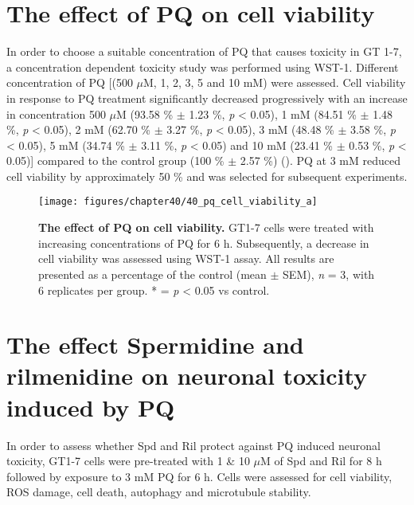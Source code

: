 \section{The effect of PQ on cell viability}
In order to choose a suitable concentration of PQ that causes toxicity in GT 1-7, a concentration dependent toxicity study was performed using WST-1. Different concentration of PQ [(500 $\mu$M, 1, 2, 3, 5 and 10 mM) were assessed. Cell viability in response to PQ treatment significantly decreased progressively with an increase in concentration 500 $\mu$M (93.58 \% $\pm$ 1.23 \%, \textit{p} < 0.05), 1 mM (84.51 \% $\pm$ 1.48 \%, \textit{p} < 0.05), 2 mM (62.70 \% $\pm$ 3.27 \%, \textit{p} < 0.05), 3 mM (48.48 \% $\pm$ 3.58 \%, \textit{p} < 0.05), 5 mM (34.74 \% $\pm$ 3.11 \%, \textit{p} < 0.05) and 10 mM (23.41 \% $\pm$ 0.53 \%, \textit{p} < 0.05)] compared to the control group (100 \% $\pm$ 2.57 \%) (). PQ at 3 mM reduced cell viability by approximately 50 \% and was selected for subsequent experiments.


\begin{figure}[!htbp]
\center
  \texttt{[image: figures/chapter40/40\_pq\_cell\_viability\_a]}
  \caption[The effect of PQ on cell viability]{\textbf{The effect of PQ on cell viability.} GT1-7 cells were treated with increasing concentrations of PQ for 6 h. Subsequently, a decrease in cell viability was assessed using WST-1 assay. All results are presented as a percentage of the control (mean $\pm$ SEM), \textit{n} = 3, with 6 replicates per group. * = \textit{p} < 0.05 vs control.}
  \label{fig:40_pq_cell_viability_a}
\end{figure} 

\section{The effect Spermidine and rilmenidine on neuronal toxicity induced by PQ}
In order to assess whether Spd and Ril protect against PQ induced neuronal toxicity, GT1-7 cells were pre-treated with 1 \& 10 $\mu$M of Spd and Ril for 8 h followed by exposure to 3 mM PQ for 6 h. Cells were assessed for cell viability, ROS damage, cell death, autophagy and microtubule stability.

